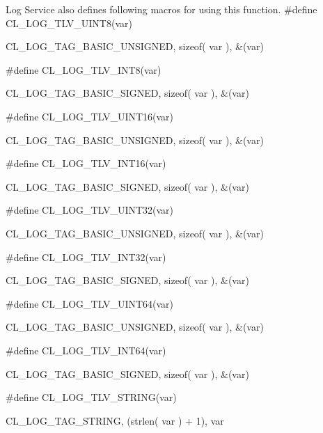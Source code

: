 \begin{flushleft}
\begin{Desc}
\begin{description}
Log Service also defines following macros for using this function.
\#define CL\_\-LOG\_\-TLV\_\-UINT8(var)			
\par
CL\_\-LOG\_\-TAG\_\-BASIC\_\-UNSIGNED, sizeof( var ), \&(var)
\par
\#define CL\_\-LOG\_\-TLV\_\-INT8(var)				
\par
CL\_\-LOG\_\-TAG\_\-BASIC\_\-SIGNED, sizeof( var ), \&(var)
\par
\#define CL\_\-LOG\_\-TLV\_\-UINT16(var)				
\par
CL\_\-LOG\_\-TAG\_\-BASIC\_\-UNSIGNED, sizeof( var ), \&(var)
\par
\#define CL\_\-LOG\_\-TLV\_\-INT16(var)				
\par
CL\_\-LOG\_\-TAG\_\-BASIC\_\-SIGNED, sizeof( var ), \&(var)
\par
\#define CL\_\-LOG\_\-TLV\_\-UINT32(var)				
\par
CL\_\-LOG\_\-TAG\_\-BASIC\_\-UNSIGNED, sizeof( var ), \&(var)
\par
\#define CL\_\-LOG\_\-TLV\_\-INT32(var)				
\par
CL\_\-LOG\_\-TAG\_\-BASIC\_\-SIGNED, sizeof( var ), \&(var)
\par
\#define CL\_\-LOG\_\-TLV\_\-UINT64(var)				
\par
CL\_\-LOG\_\-TAG\_\-BASIC\_\-UNSIGNED, sizeof( var ), \&(var)
\par
\#define CL\_\-LOG\_\-TLV\_\-INT64(var)				
\par
CL\_\-LOG\_\-TAG\_\-BASIC\_\-SIGNED, sizeof( var ), \&(var)
\par
\#define CL\_\-LOG\_\-TLV\_\-STRING(var)				
\par
CL\_\-LOG\_\-TAG\_\-STRING, (strlen( var ) + 1), var


\end{description}
\end{Desc}
\end{flushleft}
